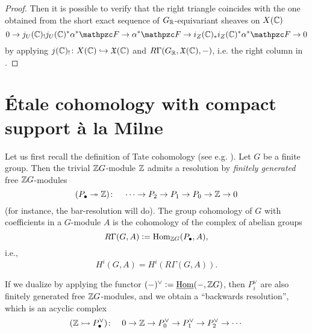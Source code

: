 \begin{proposition}
\begin{proof}
    Then it is possible to verify that the right triangle coincides with the one
    obtained from the short exact sequence of $G_{\mathbb{R}}$-equivariant sheaves on
    $X (\mathbb{C})$
    \[ 0 \to j_U (\CC)_! j_U (\CC)^* \alpha^* \mathcal{F} \to
      \alpha^* \mathcal{F} \to
      i_Z (\CC)_* i_Z (\CC)^* \alpha^* \mathcal{F} \to 0 \]
    by applying $j (\mathbb{C})_! \colon X (\mathbb{C}) \hookrightarrow \mathfrak{X} (\mathbb{C})$
    and $R\Gamma (G_{\mathbb{R}}, \mathfrak{X} (\mathbb{C}), -)$, i.e. the right column in
    .
  \end{proof}
\end{proposition}


\section{Étale cohomology with compact support à la Milne}
\label{section:compact-support-a-la-Milne}

Let us first recall the definition of Tate cohomology
(see e.g. \cite[Chapter~VI]{Brown-1994}). Let $G$ be a finite group. Then the
trivial $\mathbb{Z} G$-module $\mathbb{Z}$ admits a resolution by \emph{finitely generated}
free $\mathbb{Z} G$-modules
\begin{equation}
  \label{eqn:projective-resolution-of-Z}
  (P_\bullet\twoheadrightarrow \mathbb{Z})\colon \quad
  \cdots \to P_2 \to P_1 \to P_0 \to \mathbb{Z} \to 0
\end{equation}
(for instance, the bar-resolution will do). The group cohomology of $G$ with
coefficients in a $G$-module $A$ is the cohomology of the complex of abelian
groups
$$R\Gamma (G,A) \mathrel{\mathop:}= \operatorname{Hom}_{\mathbb{Z} G} (P_\bullet, A),$$
i.e.,
$$H^i (G,A) = H^i (R\Gamma (G,A)).$$

If we dualize  by applying the functor
$(-)^\vee \mathrel{\mathop:}= \underline{\operatorname{Hom}} (-, \mathbb{Z} G)$, then $P_i^\vee$ are also finitely generated
free $\mathbb{Z} G$-modules, and we obtain a ``backwards resolution'', which is an
acyclic complex
\begin{equation}
  \label{eqn:backwards-projective-resolution}
  (\mathbb{Z}\rightarrowtail P_\bullet^\vee)\colon \quad
  0 \to \mathbb{Z} \to P_0^\vee \to P_1^\vee \to P_2^\vee \to \cdots
\end{equation}

